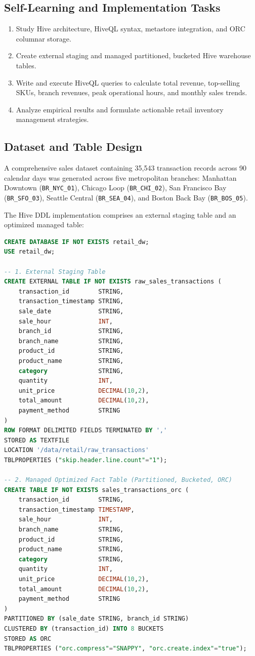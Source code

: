 \documentclass[12pt,a4paper]{report}
\begin{document}
\subsection{Self-Learning and Implementation Tasks}
\begin{enumerate}
    \item Study Hive architecture, HiveQL syntax, metastore integration, and ORC columnar storage.
    \item Create external staging and managed partitioned, bucketed Hive warehouse tables.
    \item Write and execute HiveQL queries to calculate total revenue, top-selling SKUs, branch revenues, peak operational hours, and monthly sales trends.
    \item Analyze empirical results and formulate actionable retail inventory management strategies.
\end{enumerate}

\subsection{Dataset and Table Design}
A comprehensive sales dataset containing 35,543 transaction records across 90 calendar days was generated across five metropolitan branches: Manhattan Downtown (\texttt{BR\_NYC\_01}), Chicago Loop (\texttt{BR\_CHI\_02}), San Francisco Bay (\texttt{BR\_SFO\_03}), Seattle Central (\texttt{BR\_SEA\_04}), and Boston Back Bay (\texttt{BR\_BOS\_05}).

The Hive DDL implementation comprises an external staging table and an optimized managed table:
\begin{lstlisting}[language=SQL, caption={Hive Data Warehouse Schema Definition}]
CREATE DATABASE IF NOT EXISTS retail_dw;
USE retail_dw;

-- 1. External Staging Table
CREATE EXTERNAL TABLE IF NOT EXISTS raw_sales_transactions (
    transaction_id        STRING,
    transaction_timestamp STRING,
    sale_date             STRING,
    sale_hour             INT,
    branch_id             STRING,
    branch_name           STRING,
    product_id            STRING,
    product_name          STRING,
    category              STRING,
    quantity              INT,
    unit_price            DECIMAL(10,2),
    total_amount          DECIMAL(10,2),
    payment_method        STRING
)
ROW FORMAT DELIMITED FIELDS TERMINATED BY ','
STORED AS TEXTFILE
LOCATION '/data/retail/raw_transactions'
TBLPROPERTIES ("skip.header.line.count"="1");

-- 2. Managed Optimized Fact Table (Partitioned, Bucketed, ORC)
CREATE TABLE IF NOT EXISTS sales_transactions_orc (
    transaction_id        STRING,
    transaction_timestamp TIMESTAMP,
    sale_hour             INT,
    branch_name           STRING,
    product_id            STRING,
    product_name          STRING,
    category              STRING,
    quantity              INT,
    unit_price            DECIMAL(10,2),
    total_amount          DECIMAL(10,2),
    payment_method        STRING
)
PARTITIONED BY (sale_date STRING, branch_id STRING)
CLUSTERED BY (transaction_id) INTO 8 BUCKETS
STORED AS ORC
TBLPROPERTIES ("orc.compress"="SNAPPY", "orc.create.index"="true");
\end{lstlisting}
\end{document}
